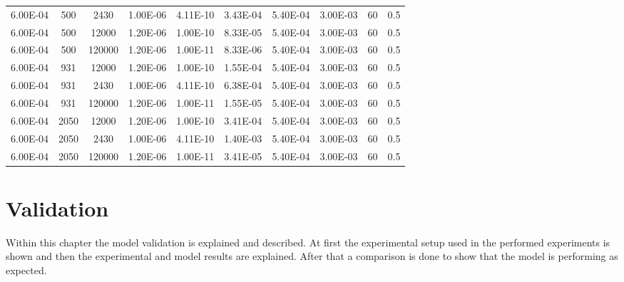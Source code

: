 \documentclass[../thesis.tex]{subfiles}
\begin{document}
\begin{landscape}
\begin{table}[htb]
\begin{tabular}{cccccccccc}
			6.00E-04            & 500         & 2430        & 1.00E-06               & 4.11E-10               & 3.43E-04              & 5.40E-04      & 3.00E-03        & 60                            & 0.5                       \\
			6.00E-04            & 500         & 12000       & 1.20E-06               & 1.00E-10               & 8.33E-05              & 5.40E-04      & 3.00E-03        & 60                            & 0.5                       \\
			6.00E-04            & 500         & 120000      & 1.20E-06               & 1.00E-11               & 8.33E-06              & 5.40E-04      & 3.00E-03        & 60                            & 0.5                       \\
			6.00E-04            & 931         & 12000       & 1.20E-06               & 1.00E-10               & 1.55E-04              & 5.40E-04      & 3.00E-03        & 60                            & 0.5                       \\
			6.00E-04            & 931         & 2430        & 1.00E-06               & 4.11E-10               & 6.38E-04              & 5.40E-04      & 3.00E-03        & 60                            & 0.5                       \\
			6.00E-04            & 931         & 120000      & 1.20E-06               & 1.00E-11               & 1.55E-05              & 5.40E-04      & 3.00E-03        & 60                            & 0.5                       \\
			6.00E-04            & 2050        & 12000       & 1.20E-06               & 1.00E-10               & 3.41E-04              & 5.40E-04      & 3.00E-03        & 60                            & 0.5                       \\
			6.00E-04            & 2050        & 2430        & 1.00E-06               & 4.11E-10               & 1.40E-03              & 5.40E-04      & 3.00E-03        & 60                            & 0.5                       \\
			6.00E-04            & 2050        & 120000      & 1.20E-06               & 1.00E-11               & 3.41E-05              & 5.40E-04      & 3.00E-03        & 60                            & 0.5						\\
			\hline      
		\end{tabular}
	\end{table}
\end{landscape}

\section{Validation}
\label{chp:validation}
Within this chapter the model validation is explained and described. At first the experimental setup used in the performed experiments is shown and then the experimental and model results are explained. After that a comparison is done to show that the model is performing as expected.
\end{document}

